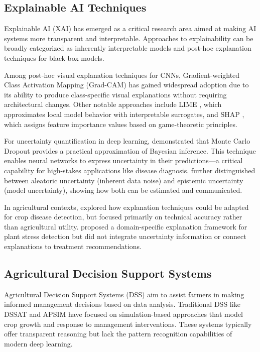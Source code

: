 \subsection{Explainable AI Techniques}

Explainable AI (XAI) has emerged as a critical research area aimed at making AI systems more transparent and interpretable. Approaches to explainability can be broadly categorized as inherently interpretable models and post-hoc explanation techniques for black-box models.

Among post-hoc visual explanation techniques for CNNs, Gradient-weighted Class Activation Mapping (Grad-CAM) \cite{selvaraju2017grad} has gained widespread adoption due to its ability to produce class-specific visual explanations without requiring architectural changes. Other notable approaches include LIME \cite{ribeiro2016should}, which approximates local model behavior with interpretable surrogates, and SHAP \cite{lundberg2017unified}, which assigns feature importance values based on game-theoretic principles.

For uncertainty quantification in deep learning, \cite{gal2016dropout} demonstrated that Monte Carlo Dropout provides a practical approximation of Bayesian inference. This technique enables neural networks to express uncertainty in their predictions—a critical capability for high-stakes applications like disease diagnosis. \cite{kendall2017uncertainties} further distinguished between aleatoric uncertainty (inherent data noise) and epistemic uncertainty (model uncertainty), showing how both can be estimated and communicated.

In agricultural contexts, \cite{obermeyer2019dissecting} explored how explanation techniques could be adapted for crop disease detection, but focused primarily on technical accuracy rather than agricultural utility. \cite{phillips2020adaptive} proposed a domain-specific explanation framework for plant stress detection but did not integrate uncertainty information or connect explanations to treatment recommendations.

\subsection{Agricultural Decision Support Systems}

Agricultural Decision Support Systems (DSS) aim to assist farmers in making informed management decisions based on data analysis. Traditional DSS like DSSAT \cite{jones2003dssat} and APSIM \cite{keating2003overview} have focused on simulation-based approaches that model crop growth and response to management interventions. These systems typically offer transparent reasoning but lack the pattern recognition capabilities of modern deep learning.

